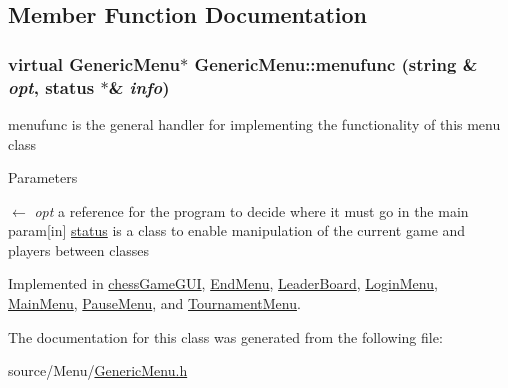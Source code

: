 \subsection{Member Function Documentation}
\hypertarget{classGenericMenu_a290ad7ec3331edc968190b1d7b48a397}{
\subsubsection[{menufunc}]{\setlength{\rightskip}{0pt plus 5cm}virtual {\bf GenericMenu}$\ast$ GenericMenu::menufunc (string \& {\em opt}, \/  {\bf status} $\ast$\& {\em info})}}
\label{classGenericMenu_a290ad7ec3331edc968190b1d7b48a397}


menufunc is the general handler for implementing the functionality of this menu class 
\begin{DoxyParams}{Parameters}
\item[\mbox{$\leftarrow$} {\em opt}]a reference for the program to decide where it must go in the main param\mbox{[}in\mbox{]} \hyperlink{classstatus}{status} is a class to enable manipulation of the current game and players between classes \end{DoxyParams}


Implemented in \hyperlink{classchessGameGUI_afcafe4d3b432bae7cd8439b689886a8d}{chessGameGUI}, \hyperlink{classEndMenu_a8fc10a35897496066f1db862bad44028}{EndMenu}, \hyperlink{classLeaderBoard_a848e37073627647d9ace936690d6e3bb}{LeaderBoard}, \hyperlink{classLoginMenu_a2f391af29531a557e0547294e97132fe}{LoginMenu}, \hyperlink{classMainMenu_aed53ec0c027843a2a1204235fe2924ea}{MainMenu}, \hyperlink{classPauseMenu_a7926ffe9dd0aa74281d8cb8126cd9c10}{PauseMenu}, and \hyperlink{classTournamentMenu_a86ce030ba6728404ddc49aaacb45dd34}{TournamentMenu}.

The documentation for this class was generated from the following file:\begin{DoxyCompactItemize}
\item 
source/Menu/\hyperlink{GenericMenu_8h}{GenericMenu.h}\end{DoxyCompactItemize}
